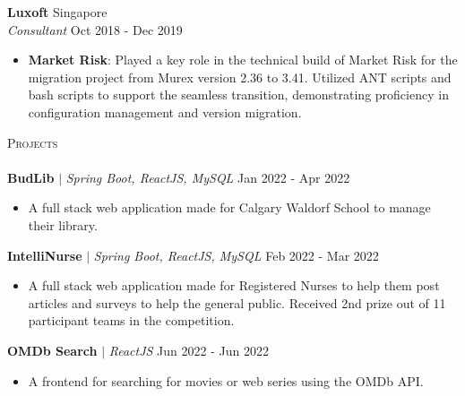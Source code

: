 \documentclass[a4paper]{article}
\newcommand{\lineunder} {
    \vspace*{-8pt} \\
    \hspace*{-18pt} \hrulefill \\
}
\newcommand{\header} [1] {
    {\hspace*{-18pt}\vspace*{6pt} \textsc{#1}}
    \vspace*{-6pt} \lineunder
}
\newcommand{\resumeItemExperience}[2]{
  \item{
    \begin{justify}
    \setlength{\rightskip}{0.15in} \textbf{#1}{: #2 \vspace{-2pt}}
    \end{justify}
  }
}
\newcommand{\resumeItemProject}[1]{
  \item{
    \begin{justify}
    \setlength{\rightskip}{0.15in} {#1 \vspace{-4pt}}
    \end{justify}
  }
}
\begin{document}
\textbf{Luxoft} \hfill Singapore\\
\textit{Consultant} \hfill Oct 2018 - Dec 2019\\
\vspace{-1mm}
\begin{itemize} \itemsep 1pt
    \resumeItemExperience{Market Risk} {Played a key role in the technical build of Market Risk for the migration project from Murex version 2.36 to 3.41. Utilized ANT scripts and bash scripts to support the seamless transition, demonstrating proficiency in configuration management and version migration.}
\end{itemize}



\header{Projects}
\vspace{1mm}
{\textbf{BudLib}} $|$ \emph{Spring Boot, ReactJS, MySQL} \hfill {Jan 2022 - Apr 2022}
\begin{itemize}
    \resumeItemProject {A full stack web application made for Calgary Waldorf School to manage their library.}


\end{itemize}
\vspace*{1mm}
{\textbf{IntelliNurse}} $|$ \emph{Spring Boot, ReactJS, MySQL} \hfill {Feb 2022 - Mar 2022}
\begin{itemize}
    \resumeItemProject {A full stack web application made for Registered Nurses to help them post articles and surveys to help the general public. Received 2nd prize out of 11 participant teams in the competition.}

\end{itemize}
\vspace*{1mm}
{\textbf{OMDb Search}} $|$ \emph{ReactJS} \hfill {Jun 2022 - Jun 2022}
\begin{itemize}
    \resumeItemProject {A frontend for searching for movies or web series using the OMDb API.}
\vspace*{1mm}
\end{itemize}
\end{document}
